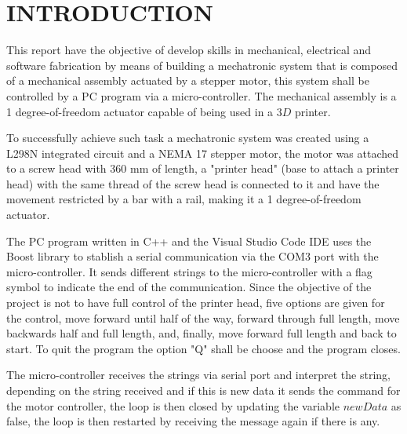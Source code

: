 \documentclass[transmag]{IEEEtran}
\begin{document}
\maketitle
\thispagestyle{empty}

\clearpage
\newpage

\clearpage\thispagestyle{empty}
\onecolumn

\tableofcontents


\lstlistoflistings

\clearpage
\newpage

\twocolumn







\section{INTRODUCTION}

This report have the objective of develop skills in mechanical, electrical and software fabrication by means of building a mechatronic system that is composed of a mechanical assembly actuated by a stepper motor, this system shall be controlled by a PC program via a micro-controller. The mechanical assembly is a 1 degree-of-freedom actuator capable of being used in a $3D$ printer.

To successfully achieve such task a mechatronic system was created using a L298N integrated circuit and a NEMA 17 stepper motor, the motor was attached to a screw head with 360 mm of length, a "printer head" (base to attach a printer head) with the same thread of the screw head is connected to it and have the movement restricted by a bar with a rail, making it a 1 degree-of-freedom actuator.

The PC program written in C++ and the Visual Studio Code IDE uses the Boost library to stablish a serial communication via the COM3 port with the micro-controller. It sends different strings to the micro-controller with a flag symbol to indicate the end of the communication. Since the objective of the project is not to have full control of the printer head, five options are given for the control, move forward until half of the way, forward through full length, move backwards half and full length, and, finally, move forward full length and back to start. To quit the program the option "Q" shall be choose and the program closes.

The micro-controller receives the strings via serial port and interpret the string, depending on the string received and if this is new data it sends the command for the motor controller, the loop is then closed by updating the variable $newData$ as false, the loop is then restarted by receiving the message again if there is any.
\end{document}
